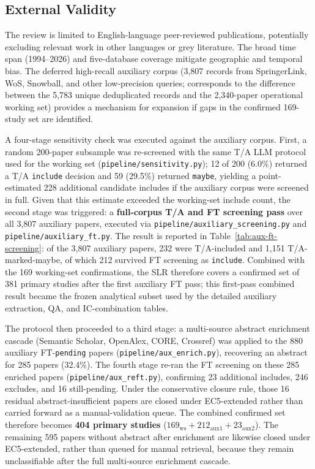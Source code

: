 \subsection{External Validity}

The review is limited to English-language peer-reviewed publications,
potentially excluding relevant work in other languages or grey literature.
The broad time span (1994--2026) and five-database coverage mitigate
geographic and temporal bias. The deferred high-recall auxiliary corpus
(3{,}807 records from SpringerLink, WoS, Snowball, and other low-precision
queries; corresponds to the difference between the 5{,}783 unique deduplicated
records and the 2{,}340-paper operational working set) provides a mechanism
for expansion if gaps in the confirmed 169-study set are identified.

A four-stage sensitivity check was executed against the auxiliary corpus.
First, a random 200-paper subsample was re-screened with the same T/A LLM
protocol used for the working set
(\texttt{pipeline/sensitivity.py}); 12 of 200 (6.0\%) returned a T/A
\texttt{include} decision and 59 (29.5\%) returned \texttt{maybe}, yielding
a point-estimated 228 additional candidate includes if the auxiliary corpus
were screened in full. Given that this estimate exceeded the working-set
include count, the second stage was triggered: a \textbf{full-corpus
T/A and FT screening pass} over all 3{,}807 auxiliary papers, executed via
\texttt{pipeline/auxiliary\_screening.py} and
\texttt{pipeline/auxiliary\_ft.py}. The result is reported in
Table~\ref{tab:aux-ft-screening}: of the 3{,}807 auxiliary papers, 232
were T/A-included and 1{,}151 T/A-marked-maybe, of which 212 survived FT
screening as \texttt{include}. Combined with the 169 working-set
confirmations, the SLR therefore covers a confirmed set of 381 primary
studies after the first auxiliary FT pass; this first-pass combined result
became the frozen analytical subset used by the detailed auxiliary
extraction, QA, and IC-combination tables.

The protocol then proceeded to a third stage: a multi-source abstract
enrichment cascade (Semantic Scholar, OpenAlex, CORE, Crossref) was applied
to the 880 auxiliary FT-\texttt{pending} papers
(\texttt{pipeline/aux\_enrich.py}), recovering an abstract for 285 papers
(32.4\%). The fourth stage re-ran the FT screening on these 285 enriched
papers (\texttt{pipeline/aux\_reft.py}), confirming 23 additional includes,
246 excludes, and 16 still-pending. Under the conservative closure rule,
those 16 residual abstract-insufficient papers are closed under EC5-extended
rather than carried forward as a manual-validation queue. The combined
confirmed set therefore becomes \textbf{404 primary studies}
($169_{\text{ws}} + 212_{\text{aux1}} + 23_{\text{aux2}}$). The remaining
595 papers without abstract after enrichment are likewise closed under
EC5-extended, rather than queued for manual retrieval, because they remain
unclassifiable after the full multi-source enrichment cascade.

